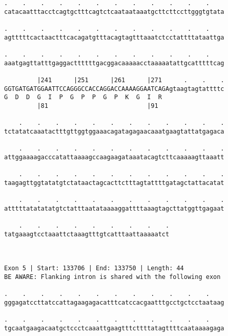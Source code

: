 \documentclass{article}
\begin{document}
\begin{Verbatim}
.    .    .    .    .    .    .    .    .    .    .    .    
catacaatttacctcagtgctttcagtctcaataataaatgcttcttccttgggtgtata
                                                            
.    .    .    .    .    .    .    .    .    .    .    .    
agtttttcactaactttcacagatgtttacagtagtttaaatctcctattttataattga
                                                            
.    .    .    .    .    .    .    .    .    .    .    .    
aaatgagttatttgaggacttttttgacggacaaaaacctaaaaatattgcatttttcag
                                                            
         |241      |251      |261      |271      .    .    .
GGTGATGATGGAATTCCAGGGCCACCAGGACCAAAAGGAATCAGAgtaagtagtattttc
G  D  D  G  I  P  G  P  P  G  P  K  G  I  R                 
         |81                           |91                  
  
    .    .    .    .    .    .    .    .    .    .    .    .
tctatatcaaatactttgttggtggaaacagatagagaacaaatgaagtattatgagaca
                                                            
    .    .    .    .    .    .    .    .    .    .    .    .
attggaaaagacccatattaaaagccaagaagataaatacagtcttcaaaaagttaaatt
                                                            
    .    .    .    .    .    .    .    .    .    .    .    .
taagagttggtatatgtctataactagcacttctttagtattttgatagctattacatat
                                                            
    .    .    .    .    .    .    .    .    .    .    .    .
atttttatatatatgtctatttaatataaaaggattttaaagtagcttatggttgagaat
                                                            
    .    .    .    .    .    .    .    .    .
tatgaaagtcctaaattctaaagtttgtcatttaattaaaaatct
                                             
                                             
 
Exon 5 | Start: 133706 | End: 133750 | Length: 44
BE AWARE: Flanking intron is shared with the following exon
 
.    .    .    .    .    .    .    .    .    .    .    .    
gggagatccttatccattagaagagacatttcatccacgaatttgcctgctcctaataag
                                                            
.    .    .    .    .    .    .    .    .    .    .    .    
tgcaatgaagacaatgctccctcaaattgaagtttcttttatagttttcaataaaagaga
                                                            

\end{Verbatim}
\end{document}
